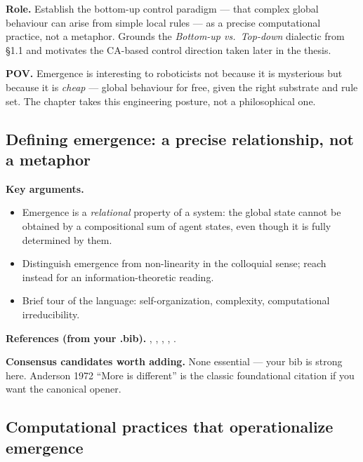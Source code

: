 \textbf{Role.} Establish the bottom-up control paradigm — that
complex global behaviour can arise from simple local rules — as
a precise computational practice, not a metaphor. Grounds the
\emph{Bottom-up vs.\ Top-down} dialectic from \S1.1 and motivates
the CA-based control direction taken later in the thesis.

\textbf{POV.} Emergence is interesting to roboticists not because it
is mysterious but because it is \emph{cheap} — global behaviour for
free, given the right substrate and rule set. The chapter takes
this engineering posture, not a philosophical one.

\subsection{Defining emergence: a precise relationship, not a metaphor}
\label{subsec:defining-emergence}

\textbf{Key arguments.}
\begin{itemize}
    \item Emergence is a \emph{relational} property of a system: the
          global state cannot be obtained by a compositional sum of
          agent states, even though it is fully determined by them.
    \item Distinguish emergence from non-linearity in the colloquial
          sense; reach instead for an information-theoretic reading.
    \item Brief tour of the language: self-organization, complexity,
          computational irreducibility.
\end{itemize}

\textbf{References (from your .bib).}
\cite{prokopenkoInformationTheoreticPrimerComplexity2006},
\cite{dehaanHowEmergenceArises2006},
\cite{ladymanWhatComplexSystem2013},
\cite{mitchellComplexityGuidedTour2011},
\cite{bonabeauNaturalArtiCial1999}.

\textbf{Consensus candidates worth adding.} None essential — your
bib is strong here. Anderson 1972 ``More is different'' is the
classic foundational citation if you want the canonical opener.

\subsection{Computational practices that operationalize emergence}
\label{subsec:computational-practices}

